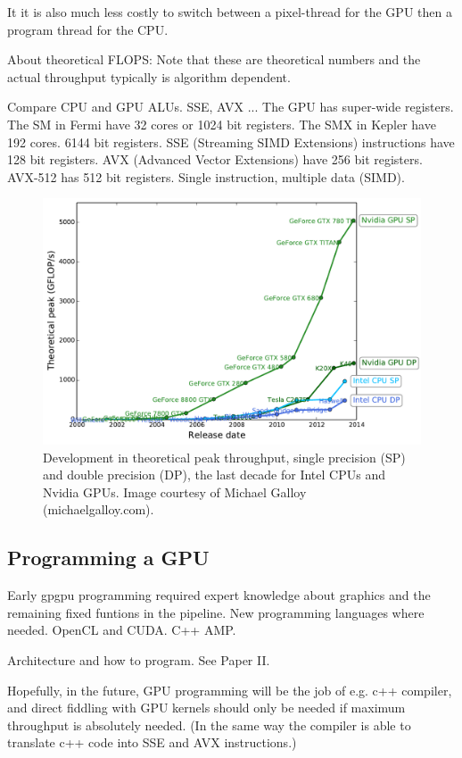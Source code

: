 It it is also much less costly to switch between a pixel-thread for the GPU then a program thread for the CPU.  

About theoretical FLOPS: Note that these are theoretical numbers and the actual throughput typically is algorithm dependent.

Compare CPU and GPU ALUs. SSE, AVX ... The GPU has super-wide registers. The SM in Fermi have 32 cores or 1024 bit registers. The SMX in Kepler have 192 cores. 6144 bit registers. SSE (Streaming SIMD Extensions) instructions have 128 bit registers. AVX (Advanced Vector Extensions) have 256 bit registers. AVX-512 has 512 bit registers. Single instruction, multiple data (SIMD).

\begin{figure}
\centering
\includegraphics[width=\textwidth]{img/cpu_vs_gpu.pdf}
\caption{Development in theoretical peak throughput, single precision (SP) and double precision (DP), the last decade for Intel CPUs and Nvidia GPUs. Image courtesy of Michael Galloy (michaelgalloy.com).}
\label{fig:cpu_vs_gpu}
\end{figure}

\subsection{Programming a GPU}
Early gpgpu programming required expert knowledge about graphics and the remaining fixed funtions in the pipeline. New programming languages where needed. OpenCL and CUDA. C++ AMP.

Architecture and how to program. See Paper II.

Hopefully, in the future, GPU programming will be the job of e.g. c++ compiler, and direct fiddling with GPU kernels should only be needed if maximum throughput is absolutely needed. (In the same way the compiler is able to translate c++ code into SSE and AVX instructions.)

